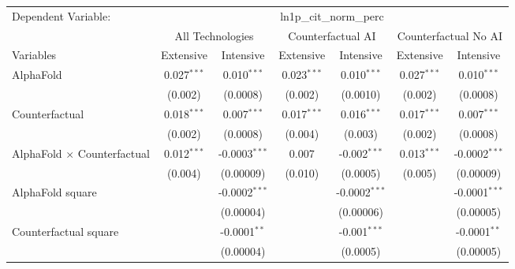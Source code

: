 \begingroup
\centering
\begin{tabular}{lcccccc}
   \tabularnewline \midrule \midrule
   Dependent Variable: & \multicolumn{6}{c}{ln1p\_cit\_norm\_perc}\\
 & \multicolumn{2}{c}{All Technologies} & \multicolumn{2}{c}{Counterfactual AI} & \multicolumn{2}{c}{Counterfactual No AI} \\
\cmidrule(lr){1-1}\cmidrule(lr){2-3} \cmidrule(lr){4-5} \cmidrule(lr){6-7}
Variables & \multicolumn{1}{c}{Extensive} & \multicolumn{1}{c}{Intensive} & \multicolumn{1}{c}{Extensive} & \multicolumn{1}{c}{Intensive} & \multicolumn{1}{c}{Extensive} & \multicolumn{1}{c}{Intensive} \\
\cmidrule(lr){1-1}\cmidrule(lr){2-2} \cmidrule(lr){3-3} \cmidrule(lr){4-4} \cmidrule(lr){5-5} \cmidrule(lr){6-6} \cmidrule(lr){7-7}
   AlphaFold                          & 0.027$^{***}$ & 0.010$^{***}$      & 0.023$^{***}$ & 0.010$^{***}$    & 0.027$^{***}$ & 0.010$^{***}$\\   
                                      & (0.002)       & (0.0008)           & (0.002)       & (0.0010)         & (0.002)       & (0.0008)\\   
   Counterfactual                     & 0.018$^{***}$ & 0.007$^{***}$      & 0.017$^{***}$ & 0.016$^{***}$    & 0.017$^{***}$ & 0.007$^{***}$\\   
                                      & (0.002)       & (0.0008)           & (0.004)       & (0.003)          & (0.002)       & (0.0008)\\   
   AlphaFold $\times$ Counterfactual  & 0.012$^{***}$ & -0.0003$^{***}$    & 0.007         & -0.002$^{***}$   & 0.013$^{***}$ & -0.0002$^{***}$\\   
                                      & (0.004)       & (0.00009)          & (0.010)       & (0.0005)         & (0.005)       & (0.00009)\\   
   AlphaFold square                   &               & -0.0002$^{***}$    &               & -0.0002$^{***}$  &               & -0.0001$^{***}$\\   
                                      &               & (0.00004)          &               & (0.00006)        &               & (0.00005)\\   
   Counterfactual square              &               & -0.0001$^{**}$     &               & -0.001$^{***}$   &               & -0.0001$^{**}$\\   
                                      &               & (0.00004)          &               & (0.0005)         &               & (0.00005)\\   

\end{tabular}
